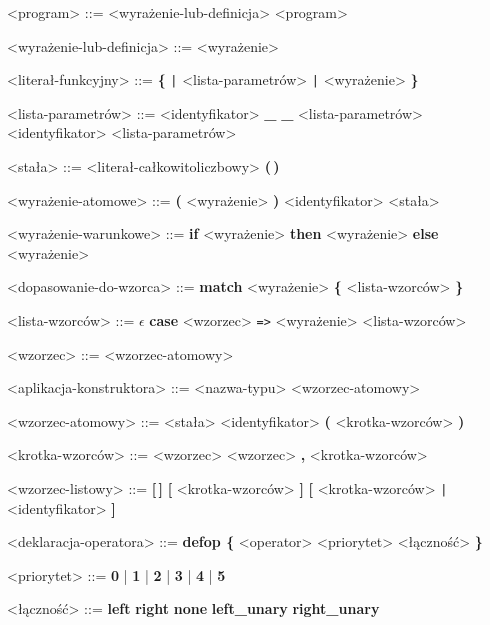 \documentclass[12pt]{article}
\begin{document}
\begin{grammar}

<program> ::=
    <wyrażenie-lub-definicja>
     <program>

<wyrażenie-lub-definicja> ::=
    <wyrażenie>

<literał-funkcyjny> ::=
    \textbf{\{} \texttt{|} <lista-parametrów> \texttt{|} <wyrażenie> \textbf{\}}

<lista-parametrów> ::=
    <identyfikator>
    \alt \textbf{_}
    \alt \textbf{_} <lista-parametrów>
    \alt <identyfikator> <lista-parametrów>

<stała> ::=
    <literał-całkowitoliczbowy>
    \alt \textbf{(\,)}

<wyrażenie-atomowe> ::=
    \textbf{(} <wyrażenie> \textbf{)}
    \alt <identyfikator>
    \alt <stała>

<wyrażenie-warunkowe> ::=
    \textbf{if} <wyrażenie>
    \textbf{then} <wyrażenie>
    \textbf{else} <wyrażenie>

<dopasowanie-do-wzorca> ::=
    \textbf{match} <wyrażenie> \textbf{\{}
    <lista-wzorców> \textbf{\}}

<lista-wzorców> ::= $\epsilon$
    \alt \textbf{case} <wzorzec> \texttt{=>} <wyrażenie> <lista-wzorców>

<wzorzec> ::=
    <wzorzec-atomowy>

<aplikacja-konstruktora> ::=
    <nazwa-typu> <wzorzec-atomowy>

<wzorzec-atomowy> ::=
    <stała>
    \alt <identyfikator>
    \alt \textbf{(} <krotka-wzorców> \textbf{)}

<krotka-wzorców> ::=
    <wzorzec>
    \alt <wzorzec> \textbf{,} <krotka-wzorców>

<wzorzec-listowy> ::=
    \textbf{[\,]}
    \alt \textbf{[} <krotka-wzorców> \textbf{]}
    \alt \textbf{[} <krotka-wzorców> \texttt{|} <identyfikator> \textbf{]}

<deklaracja-operatora> ::=
    \textbf{defop \{} <operator> <priorytet> <łączność> \textbf{\}}

<priorytet> ::=
    \textbf{0} | \textbf{1} | \textbf{2} | \textbf{3} | \textbf{4} | \textbf{5}

<łączność> ::=
    \textbf{left}
    \alt \textbf{right}
    \alt \textbf{none}
    \alt \textbf{left_unary}
    \alt \textbf{right_unary}


\end{grammar}
\end{document}
